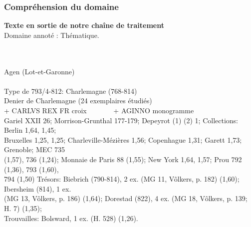 \documentclass[10pt, compress]{beamer}
\begin{document}
\begin{frame}[fragile]
	\frametitle{Compréhension du domaine}

	\textbf{Texte en sortie de notre chaîne de traitement}\\
	Domaine annoté : \colorbox{blue!30}{Thématique}.\\~\\~\\
\begin{scriptsize}
\colorbox{blue!30}{Agen (Lot-et-Garonne)}\\~\\

\colorbox{blue!30}{Type de 793/4-812}: Charlemagne (768-814)\\
\colorbox{blue!30}{Denier de Charlemagne} (24 exemplaires étudiés)\\
\colorbox{blue!30}{+ CARLVS REX FR croix~~~~~~~ + AGINNO monogramme}\\
Gariel XXII 26; Morrison-Grunthal 177-179; Depeyrot (1) (2) 1; Collections: \colorbox{blue!30}{Berlin 1,64, 1,45;}\\
\colorbox{blue!30}{Bruxelles 1,25, 1,25; Charleville-Mézières 1,56; Copenhague 1,31; Garett 1,73; Grenoble; MEC 735} \\
\colorbox{blue!30}{(1,57), 736 (1,24); Monnaie de Paris 88 (1,55); New York 1,64, 1,57; Prou 792 (1,36), 793 (1,60),} \\
\colorbox{blue!30}{794 (1,50)} Trésors: \colorbox{blue!30}{Biebrich (790-814), 2 ex. (MG 11, Vôlkers, p. 182) (1,60); Ibersheim (814), 1 ex.} \\
\colorbox{blue!30}{(MG 13, Vôlkers, p. 186) (1,64); Dorestad (822), 4 ex. (MG 18, Vôlkers, p. 139; H. 7) (1,35);}\\
Trouvailles: \colorbox{blue!30}{Bolsward, 1 ex. (H. 528) (1,26).}
\end{scriptsize}
\end{frame}

\end{document}
